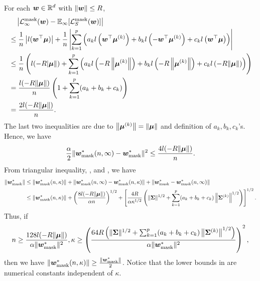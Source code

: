 For each $\vw \in \R^d$ with $\lVert \vw \rVert \leq R$, 
\begin{align*}
    &\quad \left|\mathcal{L}_\infty^{\mathrm{mask}}(\vw)-\mathbb{E}_\infty[\lossmask(\vw)] \right| \\
    &\leq \frac{1}{n} \left|l(\vw^\top \vmu) \right| + \frac{1}{n} \left | \sum_{k=1}^p \left(a_k l\left( \vw^\top \vmu^{(k)}\right) + b_k l \left( - \vw^\top \vmu^{(k)}  \right) + c_k l\left( \vw^\top \vmu \right)  \right) \right|\\
    &\leq \frac{1}{n}\left( l(-R \lvert \vmu \rVert) + \sum_{k=1}^p \left(a_k l\left(-R\left \lVert \vmu^{(k)} \right \rVert \right) + b_k l\left(-R\left \lVert \vmu^{(k)}\right \rVert\right) + c_k l\left( -R \lVert \vmu \rVert\right)  \right)\right)\\
    &= \frac{l(-R\lVert \vmu \rVert)}{n} \left(1 + \sum_{k=1}^p (a_k + b_k + c_k) \right)\\
    &= \frac{2l(-R\lVert \vmu \rVert) }{n}.
\end{align*}
The last two inequalities are due to $\left \lVert \vmu^{(k)}\right \rVert = \lVert \vmu \rVert$ and definition of $a_k,b_k,c_k$'s. Hence, we have
\begin{equation}\label{eqn:norm_converge}
    \frac{\alpha}{2}\lVert \wmask[\infty] - \vw_{\mathrm{mask}}^* \rVert^2 \leq \frac{4l(-R\lVert \vmu \rVert) }{n}.
\end{equation}
From triangular inequality, , and , we have
\begin{align*}
    \lVert \vw_{\mathrm{mask}}^*\rVert &\leq \lVert \wmask \rVert + \lVert \wmask[\infty] - \wmask\rVert + \lVert \vw_{\mathrm{mask}}^*-\wmask[\infty]\rVert\\
    &\leq  \lVert \wmask \rVert + \left(\frac{8l(-R\lVert \vmu \rVert)}{\alpha n}\right)^{1/2} + \left[\frac{4R}{\alpha \kappa^{1/2}} \left( \lVert \mSigma \rVert^{1/2} + \sum_{k=1}^p (a_k+b_k+c_k) \left \lVert \mSigma^{(k)} \right\rVert^{1/2} \right)\right]^{1/2}.
\end{align*}
Thus, if 
\begin{equation} \label{eqn:large_kappa}
n \geq \frac{128l(-R\lVert \vmu \rVert)}{\alpha\lVert  \vw_{\mathrm{mask}}^* \rVert^2} ,\kappa \geq \left(\frac{64R \left( \lVert \mSigma \rVert^{1/2} + \sum_{k=1}^p (a_k+b_k+c_k) \left \lVert \mSigma^{(k)} \right\rVert^{1/2} \right)}{\alpha \lVert  \vw_{\mathrm{mask}}^* \rVert^2}\right)^2,
\end{equation}
then we have $\lVert \wmask \rVert \geq \frac{\lVert \vw_{\mathrm{mask}}^* \rVert}{2}$.
Notice that the lower bounds in  are numerical constants independent of $\kappa$.

